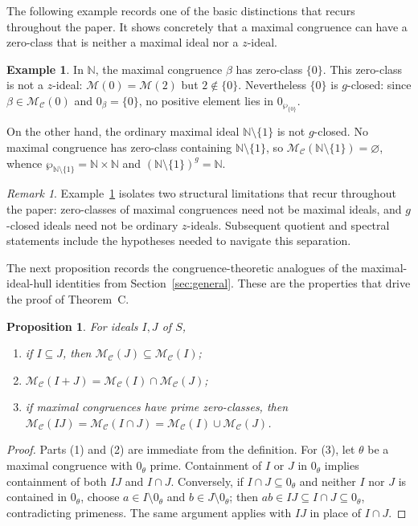 \documentclass[11pt,leqno]{amsart}
\theoremstyle{plain}
\newtheorem{proposition}[theorem]{Proposition}
\theoremstyle{definition}
\newtheorem{example}[theorem]{Example}
\theoremstyle{remark}
\newtheorem{remark}[theorem]{Remark}
\numberwithin{equation}{section}
\newcommand{\M}{\mathcal M}
\newcommand{\MC}{\mathcal M_{\mathcal C}}
\newcommand{\zero}[1]{0_{#1}}
\newcommand{\N}{\mathds N}
\begin{document}
The following example records one of the basic distinctions that
recurs throughout the paper.
It shows concretely that a maximal congruence can have a zero-class
that is neither a maximal ideal nor a $z$-ideal.

\begin{example}\label{ex:zero-class-distinction}
In $\N$, the maximal congruence $\beta$ has zero-class $\{0\}$.
This zero-class is not a $z$-ideal:
$\M(0)=\M(2)$ but $2\notin\{0\}$.
Nevertheless $\{0\}$ is $g$-closed:
since $\beta\in\MC(0)$ and $\zero\beta=\{0\}$,
no positive element lies in $0_{\wp_{\{0\}}}$.

On the other hand, the ordinary maximal ideal $\N\setminus\{1\}$
is not $g$-closed.
No maximal congruence has zero-class containing $\N\setminus\{1\}$,
so $\MC(\N\setminus\{1\})=\varnothing$,
whence $\wp_{\N\setminus\{1\}}=\N\times\N$
and $(\N\setminus\{1\})^g=\N$.
\end{example}

\begin{remark}\label{rem:zero-class-distinction}
Example~\ref{ex:zero-class-distinction} isolates two structural
limitations that recur throughout the paper:
zero-classes of maximal congruences need not be maximal ideals,
and $g$-closed ideals need not be ordinary $z$-ideals.
Subsequent quotient and spectral statements include the
hypotheses needed to navigate this separation.
\end{remark}

The next proposition records the congruence-theoretic analogues
of the maximal-ideal-hull identities from Section~\ref{sec:general}.
These are the properties that drive the proof of Theorem~C.

\begin{proposition}\label{loc24}
For ideals $I,J$ of $S$,
\begin{enumerate}
\item if $I\subseteq J$, then $\MC(J)\subseteq\MC(I)$;
\item $\MC(I+J)=\MC(I)\cap\MC(J)$;
\item if maximal congruences have prime zero-classes, then
$\MC(IJ)=\MC(I\cap J)=\MC(I)\cup\MC(J)$.
\end{enumerate}
\end{proposition}
\begin{proof}
Parts (1) and (2) are immediate from the definition.
For (3), let $\theta$ be a maximal congruence with
$\zero\theta$ prime.
Containment of $I$ or $J$ in $\zero\theta$ implies containment
of both $IJ$ and $I\cap J$.
Conversely, if $I\cap J\subseteq\zero\theta$ and neither $I$ nor $J$
is contained in $\zero\theta$, choose $a\in I\setminus\zero\theta$
and $b\in J\setminus\zero\theta$;
then $ab\in IJ\subseteq I\cap J\subseteq\zero\theta$,
contradicting primeness.
The same argument applies with $IJ$ in place of $I\cap J$.
\end{proof}
\end{document}
